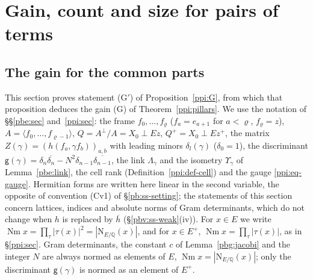 \documentclass[10pt]{amsart}
\theoremstyle{definition}
\theoremstyle{remark}
\newcommand{\Q}{\mathbb Q}
\providecommand{\aubar}[1]{\overline{#1}}
\begin{document}
\section{Gain, count and size for pairs of terms}\label{B1:g7}
\providecommand{\auO}{\mathcal O}
\providecommand{\auNm}{\operatorname{Nm}}
\providecommand{\auA}{\mathbb A}
\providecommand{\aubar}[1]{\overline{#1}}
\providecommand{\pbg}{\mathsf g}
\providecommand{\pbeAp}{A^{+}}
\providecommand{\pbeCL}{\mathrm{CL}}
\providecommand{\ppiLc}{\Lambda^{X}_{c}}
\providecommand{\ppidisc}{\operatorname{disc}}
\providecommand{\pgnD}{\mathfrak d}
\providecommand{\pgnd}{\operatorname{d}}
\providecommand{\pgnN}{\mathrm N}
\providecommand{\pgnsrc}{\operatorname{src}}
\providecommand{\pgnlm}[2]{\langle #1,#2\rangle_{\Lambda}}
\providecommand{\pgnlf}[2]{\langle\!\langle #1,#2\rangle\!\rangle}

\subsection{The gain for the common parts}\label{pbg:sec}

This section proves statement (G$'$) of Proposition~\ref{ppi:G}, from which that proposition
deduces the gain (G) of Theorem~\ref{ppi:pillars}. We use the notation of \S\S\ref{pbe:sec}
and~\ref{ppi:sec}: the frame $f_0,\dots,f_\varrho$ ($f_a=e_{a+1}$ for $a<\varrho$, $f_\varrho=z$),
$A=\langle f_0,\dots,f_{\varrho-1}\rangle$, $Q=A^\perp/A=X_0\perp Ez$, $Q^+=X_0\perp Ez^+$, the matrix
$Z(\gamma)=(h(f_a,\gamma f_b))_{a,b}$ with leading minors $\delta_l(\gamma)$ ($\delta_0=1$), the
discriminant $\pbg(\gamma)=\delta_n\aubar{\delta_n}-N^2\delta_{n-1}\aubar{\delta_{n-1}}$, the link
$\Lambda_\gamma$ and the isometry $\Upsilon_\gamma$ of Lemma~\ref{pbe:link}, the cell rank
(Definition~\ref{ppi:def-cell}) and the gauge \eqref{ppi:eq-gauge}. Hermitian forms are written here
linear in the second variable, the opposite of convention (Cv1) of \S\ref{pb:ss-setting}; the statements
of this section concern lattices, indices and absolute norms of Gram determinants, which do not change
when $h$ is replaced by $\aubar h$ (\S\ref{pbv:ss-weak}(iv)). For $x\in E$ we write $\auNm x=\prod_{\tau}|\tau(x)|^2=|\pgnN_{E/\Q}(x)|$, and for $x\in
E^+$, $\auNm x=\prod_\tau|\tau(x)|$, as in \S\ref{ppi:sec}. Gram determinants, the constant $c$ of
Lemma~\ref{pbg:jacobi} and the integer $N$ are always normed as elements of $E$, $\auNm x=|\pgnN_{E/\Q}(x)|$;
only the discriminant $\pbg(\gamma)$ is normed as an element of $E^+$.
\end{document}
